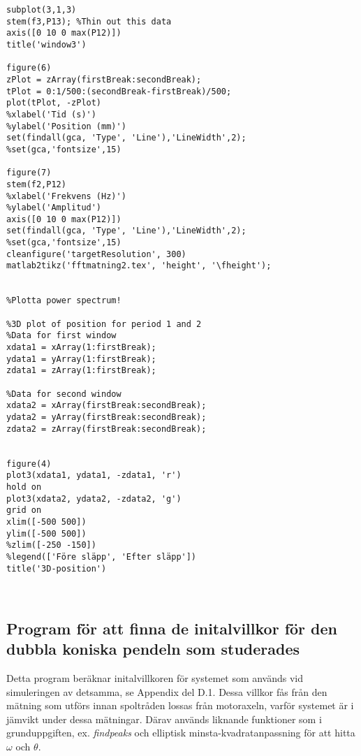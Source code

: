 \begin{lstlisting}[style=Matlab-editor]
subplot(3,1,3)
stem(f3,P13); %Thin out this data
axis([0 10 0 max(P12)])
title('window3')

figure(6)
zPlot = zArray(firstBreak:secondBreak);
tPlot = 0:1/500:(secondBreak-firstBreak)/500;
plot(tPlot, -zPlot)
%xlabel('Tid (s)')
%ylabel('Position (mm)')
set(findall(gca, 'Type', 'Line'),'LineWidth',2);
%set(gca,'fontsize',15)

figure(7)
stem(f2,P12)
%xlabel('Frekvens (Hz)')
%ylabel('Amplitud')
axis([0 10 0 max(P12)])
set(findall(gca, 'Type', 'Line'),'LineWidth',2);
%set(gca,'fontsize',15)
cleanfigure('targetResolution', 300)
matlab2tikz('fftmatning2.tex', 'height', '\fheight');


%Plotta power spectrum!

%3D plot of position for period 1 and 2
%Data for first window
xdata1 = xArray(1:firstBreak);
ydata1 = yArray(1:firstBreak);
zdata1 = zArray(1:firstBreak);

%Data for second window
xdata2 = xArray(firstBreak:secondBreak);
ydata2 = yArray(firstBreak:secondBreak);
zdata2 = zArray(firstBreak:secondBreak);


figure(4)
plot3(xdata1, ydata1, -zdata1, 'r')
hold on
plot3(xdata2, ydata2, -zdata2, 'g')
grid on
xlim([-500 500])
ylim([-500 500])
%zlim([-250 -150])
%legend(['Före släpp', 'Efter släpp'])
title('3D-position')



\end{lstlisting}



\subsection{Program för att finna de initalvillkor för den dubbla koniska pendeln som studerades}

Detta program beräknar initalvillkoren för systemet som används vid simuleringen av detsamma, se Appendix del D.1. Dessa villkor fås från den mätning som utförs innan spoltråden lossas från motoraxeln, varför systemet är i jämvikt under dessa mätningar. Därav används liknande funktioner som i grunduppgiften, ex. \textit{findpeaks} och elliptisk minsta-kvadratanpassning för att hitta $\omega$ och $\theta$.

